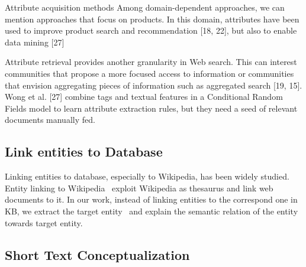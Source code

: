 Attribute acquisition methods
Among domain-dependent approaches, we can mention approaches that focus on products. In this domain, attributes have been used to improve product search and recommendation [18, 22], but also to enable data mining [27]

Attribute retrieval provides another granularity in Web
search. This can interest communities that propose a more
focused access to information or communities that envision
aggregating pieces of information such as aggregated search
[19, 15].
Wong et al. [27]
combine tags and textual features in a Conditional Random
Fields model to learn attribute extraction rules, but they
need a seed of relevant documents manually fed.


\subsection{Link entities to Database}

Linking entities to database, especially to Wikipedia, has been widely studied. Entity linking to Wikipedia~\cite{milne2008learning,mihalcea2007wikify,han2011collective} exploit Wikipedia as thesaurus and link web documents to it.
In our work, instead of linking entities to the correspond one in KB, we extract the target entity~\cite{dalvi2011automatic} and explain the semantic relation of the entity towards target entity.


\subsection{Short Text Conceptualization}
